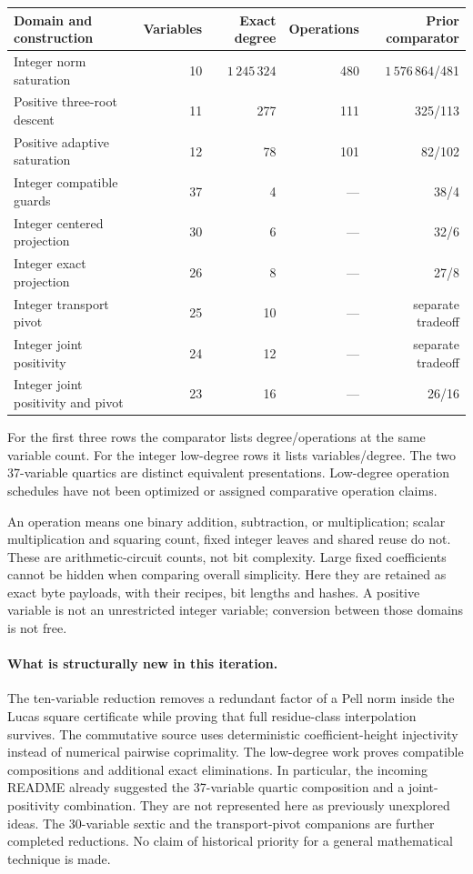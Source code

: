 \documentclass[11pt,letterpaper]{article}
\begin{document}
\begin{center}
\begin{tabular}{lrrrr}
\toprule
Domain and construction & Variables & Exact degree & Operations & Prior comparator\\
\midrule
Integer norm saturation & 10 & $1\,245\,324$ & 480 & $1\,576\,864$/481\\
Positive three-root descent & 11 & 277 & 111 & 325/113\\
Positive adaptive saturation & 12 & 78 & 101 & 82/102\\
Integer compatible guards & 37 & 4 & --- & 38/4\\
Integer centered projection & 30 & 6 & --- & 32/6\\
Integer exact projection & 26 & 8 & --- & 27/8\\
Integer transport pivot & 25 & 10 & --- & separate tradeoff\\
Integer joint positivity & 24 & 12 & --- & separate tradeoff\\
Integer joint positivity and pivot & 23 & 16 & --- & 26/16\\
\bottomrule
\end{tabular}
\end{center}
For the first three rows the comparator lists degree/operations at the
same variable count. For the integer low-degree rows it lists
variables/degree. The two 37-variable quartics are distinct equivalent
presentations. Low-degree operation schedules have not been optimized or
assigned comparative operation claims.

An operation means one binary addition, subtraction, or multiplication;
scalar multiplication and squaring count, fixed integer leaves and shared
reuse do not. These are arithmetic-circuit counts, not bit complexity.
Large fixed coefficients cannot be hidden when comparing overall
simplicity. Here they are retained as exact byte payloads, with their
recipes, bit lengths and hashes. A positive variable is not an unrestricted
integer variable; conversion between those domains is not free.

\paragraph{What is structurally new in this iteration.}
The ten-variable reduction removes a redundant factor of a Pell norm
inside the Lucas square certificate while proving that full residue-class
interpolation survives. The commutative source uses deterministic
coefficient-height injectivity instead of numerical pairwise coprimality.
The low-degree work proves compatible compositions and additional exact
eliminations. In particular, the incoming README already suggested the
37-variable quartic composition and a joint-positivity combination. They
are not represented here as previously unexplored ideas. The 30-variable
sextic and the transport-pivot companions are further completed reductions.
No claim of historical priority for a general mathematical technique is
made.
\end{document}

